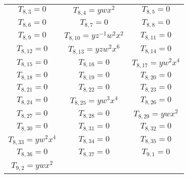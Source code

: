 \begin{longtable}{|c|c|c|}
$T_{8,3}= 0$&

$T_{8,4}= ywx^2$&

$T_{8,5}= 0$\\

$T_{8,6}= 0$&

$T_{8,7}= 0$&

$T_{8,8}= 0$\\

$T_{8,9}= 0$&

$T_{8,10}= yz^{-1}w^2x^2$&

$T_{8,11}= 0$\\

$T_{8,12}= 0$&

$T_{8,13}= yzw^2x^6$&

$T_{8,14}= 0$\\

$T_{8,15}= 0$&

$T_{8,16}= 0$&

$T_{8,17}= yw^2x^4$\\

$T_{8,18}= 0$&

$T_{8,19}= 0$&

$T_{8,20}= 0$\\

$T_{8,21}= 0$&

$T_{8,22}= 0$&

$T_{8,23}= 0$\\

$T_{8,24}= 0$&

$T_{8,25}= yw^3x^4$&

$T_{8,26}= 0$\\

$T_{8,27}= 0$&

$T_{8,28}= 0$&

$T_{8,29}= ywx^2$\\

$T_{8,30}= 0$&

$T_{8,31}= 0$&

$T_{8,32}= 0$\\

$T_{8,33}= yw^2x^4$&

$T_{8,34}= 0$&

$T_{8,35}= 0$\\

$T_{8,36}= 0$&

$T_{8,37}= 0$&

$T_{9,1}= 0$\\

$T_{9,2}= ywx^2$&


\end{longtable}
